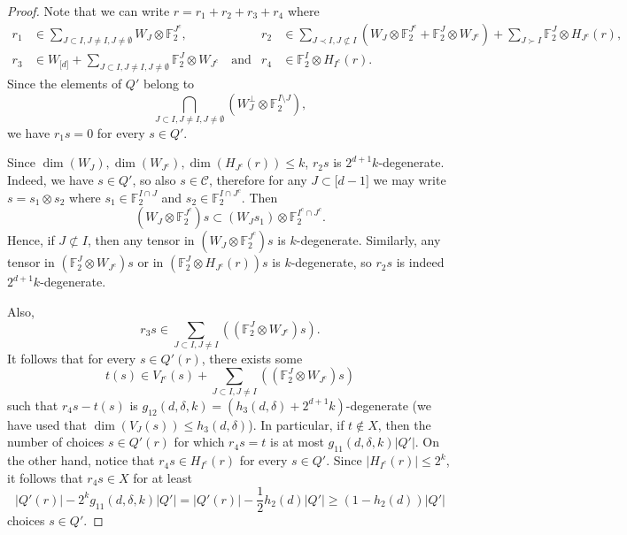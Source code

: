 \documentclass[11pt]{article}
\numberwithin{equation}{section}
\theoremstyle{definition}
\theoremstyle{plain}
\newcommand\F{\mathbb{F}}
\renewcommand\d{\delta}
\newcommand \cC{\mathcal C}
\newcommand \s{\subset}
\begin{document}
\begin{proof}
  Note that we can write $r=r_1+r_2+r_3+r_4$ where
  \begin{align*}
    r_1 &\in \sum_{J\subset I,J\neq I,J\neq \emptyset} W_J\otimes \F_2^{J^c}, & r_2 &\in \sum_{J\prec I, J\not \subset I} (W_J\otimes \F_2^{J^c}+\F_2^{J}\otimes W_{J^c})+\sum_{J\succ I} \F_2^{J}\otimes H_{J^c}(r),\\
    r_3 &\in W_{\lbrack d\rbrack}+\sum_{J\subset I,J\neq I,J\neq \emptyset} \F_2^{J}\otimes W_{J^c} \quad\text{and} &  r_4 &\in \F_2^{I}\otimes H_{I^c}(r).
  \end{align*}
  Since the elements of $Q'$ belong to
  \[
    \bigcap_{J\subset I,J\neq I,J\neq \emptyset}(W_J^{\perp}\otimes \F_2^{I \setminus J}),
  \]
  we have $r_1s=0$ for every $s\in Q'$.
	
  Since $\dim(W_J),\dim(W_{J^c}),\dim(H_{J^c}(r))\leq k$, $r_2s$ is $2^{d+1}k$-degenerate. Indeed, we have $s\in Q'$, so also $s\in \cC$, therefore for any $J\s \lbrack d-1\rbrack$ we may write $s=s_1\otimes s_2$ where $s_1\in \F_2^{I\cap J}$ and $s_2\in \F_2^{I\cap J^c}$. Then
  \[
    (W_J\otimes \F_2^{J^c})s\s (W_Js_1)\otimes \F_2^{I^c\cap J^c}.
  \]
  Hence, if $J\not \s I$, then any tensor in
  $(W_J\otimes \F_2^{J^c})s$ is $k$-degenerate. Similarly, any tensor
  in $(\F_2^J\otimes W_{J^c})s$ or in $(\F_2^J\otimes H_{J^c}(r))s$ is
  $k$-degenerate, so $r_2s$ is indeed $2^{d+1}k$-degenerate.
	
  Also,
  \[
    r_3s\in \sum_{J\subset I,J\neq I} ((\F_2^{J}\otimes W_{J^c})s).
  \]
  It follows that for every $s\in Q'(r)$, there exists some
  \[
    t(s)\in V_{I^c}(s)+\sum_{J\subset I,J\neq I} ((\F_2^{J}\otimes
    W_{J^c})s)
  \]
  such that $r_4s-t(s)$ is
  $g_{12}(d,\d,k)=(h_3(d,\d)+2^{d+1}k)$-degenerate (we have used that
  $\dim (V_{J}(s))\leq h_3(d,\d)$). In particular, if $t\not \in X$,
  then the number of choices $s\in Q'(r)$ for which $r_4s=t$ is at
  most $g_{11}(d,\d,k)|Q'|$. On the other hand, notice that
  $r_4s\in H_{I^c}(r)$ for every $s\in Q'$. Since
  $|H_{I^c}(r)|\leq 2^{k}$, it follows that $r_4s\in X$ for at least
  \[
    |Q'(r)|-2^kg_{11}(d,\d,k)|Q'|=|Q'(r)|-\frac{1}{2}h_2(d)|Q'|\geq
    (1-h_2(d))|Q'|
  \]
  choices $s\in Q'$.
	

\end{proof}
\end{document}
